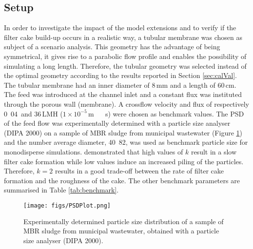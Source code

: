 \subsection{Setup \label{sec:setup}}
In order to investigate the impact of the model extensions and to verify if the filter cake build-up occurs in a realistic way, a tubular membrane was chosen as subject of a scenario analysis. This geometry has the advantage of being symmetrical, it gives rise to a parabolic flow profile and enables the possibility of simulating a long length. Therefore, the tubular geometry was selected instead of the optimal geometry according to the results reported in Section \ref{sec:calVal}. The tubular membrane had an inner diameter of 8\,mm and a length of 60\,cm. The feed was introduced at the channel inlet and a constant flux was instituted through the porous wall (membrane). A crossflow velocity and flux of respectively \unit{0.04}{\metre\, \reciprocal\second} and 36\,LMH ($1 \times 10^{-5}$\,\unit{\metre\,\reciprocal\second}) were chosen as benchmark values. The \gls{PSD} of the feed flow was experimentally determined with a particle size analyser (DIPA 2000) on a sample of \gls{MBR} sludge from municipal wastewater (Figure \ref{fig:PSDplot}) and the number average diameter, \unit{40.82}{\micro\metre}, was used as benchmark particle size for monodisperse simulations. \cite{Ghijs2014} demonstrated that high values of $k$ result in a slow filter cake formation while low values induce an increased piling of the particles. Therefore, $k = 2$ results in a good trade-off between the rate of filter cake formation and the roughness of the cake. The other benchmark parameters are summarised in Table \ref{tab:benchmark}. \par
\begin{figure}[H]
\centering
 \texttt{[image: figs/PSDPlot.png]}
 \caption{Experimentally determined particle size distribution of a sample of \gls{MBR} sludge from municipal wastewater, obtained with a particle size analyser (DIPA 2000). \label{fig:PSDplot}}
\end{figure}
